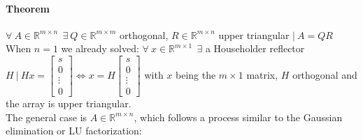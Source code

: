 \documentclass[10pt]{report}
\begin{document}
\paragraph{Theorem} $\forall\:A\in \mathbb{R}^{m\times n}\:\:\exists\:Q\in \mathbb{R}^{m\times m}$ orthogonal, $R\in \mathbb{R}^{m\times n}$ upper triangular $|\:A = QR$\\
When $n = 1$ we already solved: $\forall\:x\in \mathbb{R}^{m\times 1}\:\:\exists$ a Householder reflector $H\:|\:Hx = \left[\begin{array}{c}
s\\0\\\vdots\\0
\end{array}\right] \Leftrightarrow x = H\left[\begin{array}{c}
s\\0\\\vdots\\0
\end{array}\right]$ with $x$ being the $m\times 1$ matrix, $H$ orthogonal and the array is upper triangular.\\
The general case is $A\in \mathbb{R}^{m\times n}$, which follows a process similar to the Gaussian elimination or LU factorization:
\end{document}
